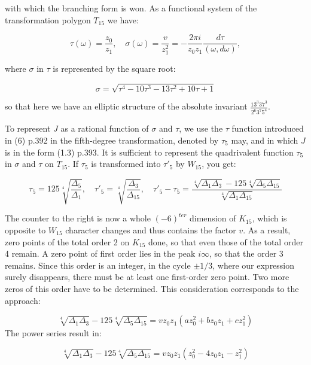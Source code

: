 \documentclass{article}
\begin{document}
with which the branching form is won. As a functional system of the transformation polygon $T_{15}$ we have:

\begin{equation}
	\tau(\omega)=\frac{z_0}{z_1},\quad\sigma(\omega)=\frac{v}{z_1^2}=-\frac{2\pi i}{z_0z_1}\frac{d\tau}{(\omega,d\omega)},
\end{equation}

where $\sigma$ in $\tau$ is represented by the square root:

\begin{equation}
	\sigma = \sqrt{\tau^4-10\tau^3-13\tau^2+10\tau+1}
\end{equation}

so that here we have an elliptic structure of the absolute invariant $\frac{13^3 37^3}{2^6 3^7 5^4}$.

To represent $ J $ as a rational function of $\sigma$ and $\tau$, we use the $\tau$ function introduced in (6) p.392 in the fifth-degree transformation, denoted by $\tau_5$ may, and in which $J$ is in the form (1.3) p.393. It is sufficient to represent the quadrivalent function $\tau_5$ in $\sigma$ and $\tau$ on $T_{15}$. If $\tau_5$ is transformed into $\tau'_5$ by $W_{15}$, you get:

\begin{equation}
  \tau_5=125\sqrt[4]{\frac{\Delta_5}{\Delta_1}},\quad
  \tau'_5=\sqrt[4]{\frac{\Delta_3}{\Delta_{15}}},\quad
\tau'_5-\tau_5=\frac{\sqrt[4]{\Delta_1\Delta_3}-125\sqrt[4]{\Delta_5\Delta_{15}}}{\sqrt[4]{\Delta_1\Delta_{15}}}
\end{equation}

The counter to the right is now a whole $(-6)^{ter}$ dimension of $K_ {15}$, which is opposite to $W_{15}$ character changes and thus contains the factor $v$. As a result, zero points of the total order 2 on $K_{15}$ done, so that even those of the total order 4 remain. A zero point of first order lies in the peak $i\infty$, so that the order 3 remains. Since this order is an integer, in the cycle $\pm1/3$, where our expression surely disappears, there must be at least one first-order zero point. Two more zeros of this order have to be determined. This consideration corresponds to the approach:

\[
  \sqrt[4]{\Delta_1\Delta_3}-125\sqrt[4]{\Delta_5\Delta_{15}}=v z_0 z_1(az_0^2+bz_0z_1+cz_1^2)
\]
The power series result in:

\begin{equation}
  \sqrt[4]{\Delta_1\Delta_3}-125\sqrt[4]{\Delta_5\Delta_{15}}=v z_0 z_1(z_0^2-4z_0z_1-z_1^2)
\end{equation}
\end{document}

